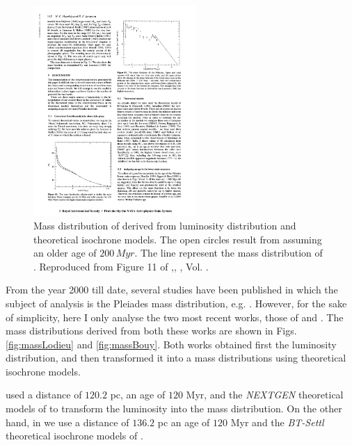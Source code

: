 \begin{figure}[ht!]
\begin{center}
\includegraphics[height=8cm]{background/Figures/F11_Hambly1991.pdf}
\caption{Mass distribution of \citet{Hambly1991} derived from luminosity distribution and theoretical isochrone models. The open circles result from assuming an older age of $200\,Myr$. The line represent the mass distribution of \citet{1980IAUS...85..157V}. Reproduced from Figure 11 of \citet{Hambly1991},\textit{}, , Vol. .}
\label{fig:massHambly}
\end{center}
\end{figure}

From the year 2000 till date, several studies have been published in which the subject of analysis is the Pleiades mass distribution, e.g. \citet{2000ASPC..198...59H, 2002MNRAS.335..853J, 2001A&A...367..211M,2003A&A...400..891M, 2004A&A...426...75M, 2007MNRAS.380..712L}. However, for the sake of simplicity, here I only analyse the two most recent works, those of \citet{Lodieu2012} and \citet{Bouy2015}. The mass distributions derived from both these works are shown in Figs. \ref{fig:massLodieu} and \ref{fig:massBouy}. Both works obtained first the luminosity distribution, and then transformed it into a mass distributions using theoretical isochrone models. 

\citet{Lodieu2012} used a distance of $120.2$ pc, an age of $120$ Myr, and the \emph{NEXTGEN} theoretical models of \citet{1998A&A...337..403B} to transform the luminosity into the mass distribution. On the other hand, in \citet{Bouy2015} we use a distance of $136.2$ pc an age of $120$ Myr and the \emph{BT-Settl} theoretical isochrone models of \citet{2014IAUS..299..271A}. 



